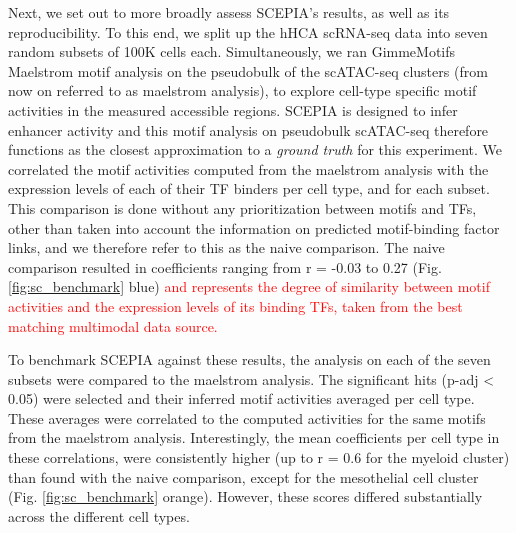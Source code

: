 Next, we set out to more broadly assess SCEPIA's results, as well as its reproducibility. To this end, we split up the hHCA scRNA-seq data into seven random subsets of 100K cells each. Simultaneously, we ran GimmeMotifs Maelstrom motif analysis on the pseudobulk of the scATAC-seq clusters (from now on referred to as maelstrom analysis), to explore cell-type specific motif activities in the measured accessible regions. SCEPIA is designed to infer enhancer activity and this motif analysis on pseudobulk scATAC-seq therefore functions as the closest approximation to a \textit{ground truth} for this experiment. We correlated the motif activities computed from the maelstrom analysis with the expression levels of each of their TF binders per cell type, and for each subset. This comparison is done without any prioritization between motifs and TFs, other than taken into account the information on predicted motif-binding factor links, and we therefore refer to this as the naive comparison. The naive comparison resulted in coefficients ranging from r = -0.03 to 0.27 (Fig. \ref{fig:sc_benchmark} blue) \textcolor{red}{and represents the degree of similarity between motif activities and the expression levels of its binding TFs, taken from the best matching multimodal data source.}

To benchmark SCEPIA against these results, the analysis on each of the seven subsets were compared to the maelstrom analysis. The significant hits (p-adj < 0.05) were selected and their inferred motif activities averaged per cell type. These averages were correlated to the computed activities for the same motifs from the maelstrom analysis. Interestingly, the mean coefficients per cell type in these correlations, were consistently higher (up to r = 0.6 for the myeloid cluster) than found with the naive comparison, except for the mesothelial cell cluster (Fig. \ref{fig:sc_benchmark} orange). However, these scores differed substantially across the different cell types.

